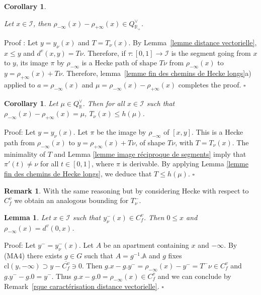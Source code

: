 \documentclass[12pt]{article}
\theoremstyle{plain}
\newtheorem{cor}[thm]{Corollary}
\newtheorem{lemme}[thm]{Lemma}
\theoremstyle{definition}
\newtheorem{rque}[thm]{Remark}
\newcommand{\R}{\mathbb{R}}
\newcommand{\A}{\mathbb{A}}
\newcommand{\I}{\mathcal{I}}
\begin{document}
\begin{cor}\label{rque condition sur mu}

 Let $x\in \mathcal{I}$, then $\rho_{-\infty}(x)-\rho_{+\infty}(x)\in Q^\vee_{\R_+}$.
\end{cor}

Proof : Let $y=y_\nu(x)$ and $T=T_\nu(x)$. By Lemma~\ref{lemme distance vectorielle},  $x\leq y$ and $d^v(x,y)=T\nu$. Therefore, if $\tau:[0,1]\rightarrow \I$ is the segment going from $x$ to $y$,  its image $\pi$ by $\rho_{-\infty}$ is a Hecke path of shape $T\nu$ from $\rho_{-\infty}(x)$ to $y=\rho_{+\infty}(x)+T\nu$. Therefore, lemma~\ref{lemme fin des chemins de Hecke longs}a) applied to $a=\rho_{-\infty}(x)$ and $\mu=\rho_{-\infty}(x)-\rho_{+\infty}(x)$ completes the proof. $\square$


\begin{cor}\label{corollaire majoration de T}
Let $\mu\in Q^\vee_\R$. Then for all $x\in \I$ such that $\rho_{-\infty}(x)-\rho_{+\infty}(x)=\mu$, $T_\nu(x)\leq h(\mu)$.
\end{cor}

Proof: Let $y=y_\nu(x)$. Let $\pi$ be the image by $\rho_{-\infty}$ of $[x,y]$. This is a Hecke path from $\rho_{-\infty}(x)$ to $y=\rho_{+\infty}(x)+T\nu$, of shape $T\nu$, with $T=T_\nu(x)$. The minimality of $T$ and Lemma \ref{lemme image réciproque de segments} imply that $\pi'(t)\neq \nu$ for all $t\in [0,1]$, where $\pi$ is derivable. By applying Lemma \ref{lemme fin des chemins de Hecke longs}, we deduce that $T\leq h(\mu)$. $\square$


\begin{rque}\label{rque majoration de T^-}
With the same reasoning but by considering Hecke with respect to $C^v_f$ we obtain an analogous bounding for $T_\nu^-$.
\end{rque}


\begin{lemme}\label{lemme_rétraction et distance vectorielle}
Let $x\in \mathcal{I}$ such that $y_\nu^-(x)\in C^v_f$. Then $0\leq x$ and $\rho_{-\infty}(x)=d^v(0,x)$.
\end{lemme}

Proof: Let $y^-=y^-_\nu(x)$. Let $A$ be an apartment containing $x$ and $-\infty$. By (MA4) there exists $g\in G$ such that $A=g^{-1}.\A$ and $g$ fixes $\mathrm{cl}(y,-\infty)\supset y-\overline{C_f^v}\ni 0$. Then $g.x-g.y^-=\rho_{-\infty}(x)-y^-=T^-\nu\in C_f^v$ and $g.y^--g.0=y^-$. Thus $g.x-g.0=\rho_{-\infty}(x)\in C_f^v$ and we can conclude by Remark~\ref{rque caractérisation distance vectorielle}. $\square$
\end{document}
